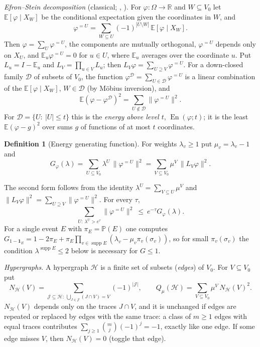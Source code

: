 \documentclass[11pt,reqno]{amsart}
\theoremstyle{definition}
\newtheorem{definition}[theorem]{Definition}
\newcommand{\E}{\mathbb E}
\newcommand{\PP}{\mathbb P}
\newcommand{\supp}{\operatorname{supp}}
\newcommand{\energy}{\operatorname{En}}
\newcommand{\Ho}{\mathcal H}
\newcommand{\cD}{\mathcal D}
\begin{document}
\emph{Efron--Stein decomposition} (classical; \cite{ES,Hoeffding},
\cite[\S8.3]{OD}).  For $\varphi:\Omega\to\mathbb R$ and $W\subseteq V_0$ let
$\E[\varphi\mid X_W]$ be the conditional expectation given the coordinates in
$W$, and
\[
 \varphi^{=U}=\sum_{W\subseteq U}(-1)^{|U\setminus W|}\,\E[\varphi\mid X_W].
\]
Then $\varphi=\sum_U\varphi^{=U}$, the components are mutually orthogonal,
$\varphi^{=U}$ depends only on $X_U$, and $\E_u\varphi^{=U}=0$ for $u\in U$, where
$\E_u$ averages over the coordinate $u$.  Put $L_u=I-\E_u$ and
$L_V=\prod_{u\in V}L_u$; then $L_V\varphi=\sum_{U\supseteq V}\varphi^{=U}$.  For a
down-closed family $\cD$ of subsets of $V_0$, the function
$\varphi^{\cD}=\sum_{U\in\cD}\varphi^{=U}$ is a linear combination of the
$\E[\varphi\mid X_W]$, $W\in\cD$ (by M\"obius inversion), and
\begin{equation}\label{eq:energy}
 \E(\varphi-\varphi^{\cD})^2=\sum_{U\notin\cD}\|\varphi^{=U}\|^2 .
\end{equation}
For $\cD=\{U:\ |U|\le t\}$ this is the \emph{energy above level $t$},
$\energy(\varphi;t)$; it is the least $\E(\varphi-g)^2$ over sums $g$ of
functions of at most $t$ coordinates.

\begin{definition}[Energy generating function]
For weights $\lambda_v\ge1$ put $\mu_v=\lambda_v-1$ and
\[
 G_\varphi(\lambda)=\sum_{U\subseteq V_0}\lambda^U\,\|\varphi^{=U}\|^2
 =\sum_{V\subseteq V_0}\mu^V\,\|L_V\varphi\|^2 .
\]
\end{definition}

The second form follows from the identity $\lambda^U=\sum_{V\subseteq U}\mu^V$ and
$\|L_V\varphi\|^2=\sum_{U\supseteq V}\|\varphi^{=U}\|^2$.  For every $\tau$,
\begin{equation}\label{eq:markov}
 \sum_{U:\ \lambda^U>e^\tau}\|\varphi^{=U}\|^2\ \le\ e^{-\tau}G_\varphi(\lambda).
\end{equation}
For a single event $E$ with $\pi_E=\PP(E)$ one computes
$G_{1-\mathbf 1_E}=1-2\pi_E+\pi_E\prod_{v\in\supp E}(\lambda_v-\mu_v\pi_v(\sigma_v))$, so for
small $\pi_v(\sigma_v)$ the condition $\lambda^{\supp E}\le2$ below is necessary for
$G\le1$.

\emph{Hypergraphs.}  A hypergraph $\Ho$ is a finite set of subsets
(\emph{edges}) of $V_0$.  For $V\subseteq V_0$ put
\[
 N_\Ho(V)=\sum_{\mathcal J\subseteq\Ho:\ \bigcup_{J\in\mathcal J}(J\cap V)=V}(-1)^{|\mathcal J|},\qquad
 Q_\mu(\Ho)=\sum_{V\subseteq V_0}\mu^V\,N_\Ho(V)^2 .
\]
$N_\Ho(V)$ depends only on the traces $J\cap V$, and it is unchanged if
edges are repeated or replaced by edges with the same trace: a class of
$m\ge1$ edges with equal traces contributes $\sum_{j\ge1}\binom mj(-1)^j=-1$,
exactly like one edge.  If some edge misses $V$, then $N_\Ho(V)=0$ (toggle
that edge).
\end{document}
